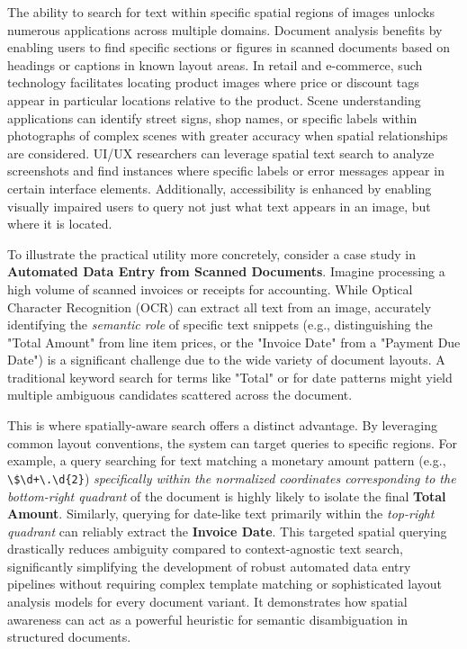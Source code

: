 \documentclass[manuscript,screen]{acmart}
\begin{document}
The ability to search for text within specific spatial regions of images unlocks numerous applications across multiple domains. Document analysis benefits by enabling users to find specific sections or figures in scanned documents based on headings or captions in known layout areas. In retail and e-commerce, such technology facilitates locating product images where price or discount tags appear in particular locations relative to the product. Scene understanding applications can identify street signs, shop names, or specific labels within photographs of complex scenes with greater accuracy when spatial relationships are considered. UI/UX researchers can leverage spatial text search to analyze screenshots and find instances where specific labels or error messages appear in certain interface elements. Additionally, accessibility is enhanced by enabling visually impaired users to query not just what text appears in an image, but where it is located.

To illustrate the practical utility more concretely, consider a case study in \textbf{Automated Data Entry from Scanned Documents}. Imagine processing a high volume of scanned invoices or receipts for accounting. While Optical Character Recognition (OCR) can extract all text from an image, accurately identifying the \textit{semantic role} of specific text snippets (e.g., distinguishing the "Total Amount" from line item prices, or the "Invoice Date" from a "Payment Due Date") is a significant challenge due to the wide variety of document layouts. A traditional keyword search for terms like "Total" or for date patterns might yield multiple ambiguous candidates scattered across the document.

This is where spatially-aware search offers a distinct advantage. By leveraging common layout conventions, the system can target queries to specific regions. For example, a query searching for text matching a monetary amount pattern (e.g., \verb|\$\d+\.\d{2}|) \textit{specifically within the normalized coordinates corresponding to the bottom-right quadrant} of the document is highly likely to isolate the final \textbf{Total Amount}. Similarly, querying for date-like text primarily within the \textit{top-right quadrant} can reliably extract the \textbf{Invoice Date}. This targeted spatial querying drastically reduces ambiguity compared to context-agnostic text search, significantly simplifying the development of robust automated data entry pipelines without requiring complex template matching or sophisticated layout analysis models for every document variant. It demonstrates how spatial awareness can act as a powerful heuristic for semantic disambiguation in structured documents.
\end{document}
